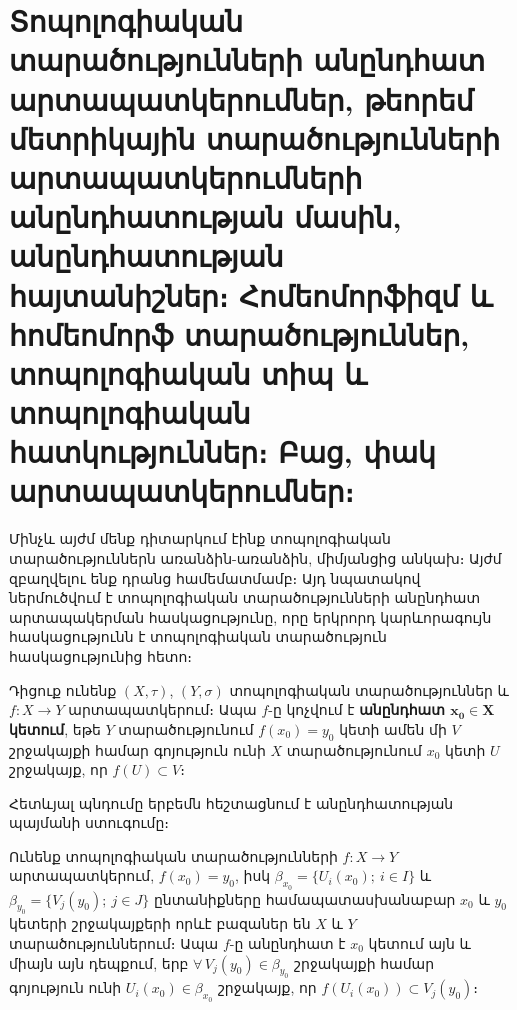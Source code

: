 \documentclass[./main.tex]{subfiles}
\begin{document}
\onehalfspacing
\section{Տոպոլոգիական տարածությունների անընդհատ արտապատկերումներ, թեորեմ մետրիկային տարածությունների արտապատկերումների անընդհատության մասին, անընդհատության հայտանիշներ։ Հոմեոմորֆիզմ և հոմեոմորֆ տարածություններ, տոպոլոգիական տիպ և տոպոլոգիական հատկություններ։ Բաց, փակ արտապատկերումներ։}
\label{sec:9}

\par Մինչև այժմ մենք դիտարկում էինք տոպոլոգիական տարածություններն առան\-ձին-առանձին, միմյանցից անկախ։ Այժմ զբաղվելու ենք դրանց համեմատմամբ։ Այդ նպատակով ներմուծվում է տոպոլոգիական տարածությունների անընդհատ արտապակերման հասկացությունը, որը երկրորդ կարևորագույն հասկացությունն է տոպոլոգիական տարածություն հասկացությունից հետո։

\begin{definition}
Դիցուք ունենք $(X, \tau)$, $(Y, \sigma)$ տոպոլոգիական տարածություններ և ${f:X \rightarrow Y}$ արտապատկերում։ Ապա $f$-ը կոչվում է \textbf{անընդհատ $\boldsymbol{x_0\in X}$ կետում}, եթե $Y$ տարածությունում $f(x_0)=y_0$ կետի ամեն մի $V$ շրջակայքի համար գոյություն ունի $X$ տարածությունում $x_0$ կետի $U$ շրջակայք, որ $f(U)\subset V$։

\end{definition}
\par Հետևյալ պնդումը երբեմն հեշտացնում է անընդհատության պայմանի ստուգումը։

\begin{theorem}\label{ch9thm1} 
Ունենք տոպոլոգիական տարածությունների ${f:X \rightarrow Y}$ արտապատ\-կերում, $f(x_0)=y_{0}$, իսկ $\beta_{x_0}=\{U_i(x_0);\ i\in I\}$ և $\beta_{y_0}=\{V_j(y_0);\ j\in J\}$ ընտանիքները համապատասխանաբար $x_0$ և $y_0$ կետերի շրջակայքերի որևէ բազաներ են $X$ և $Y$ տարածություններում։ Ապա $f$-ը անընդհատ է $x_0$ կետում այն և միայն այն դեպքում, երբ $\forall\, V_j(y_0)\in \beta_{y_0}$ շրջակայքի համար գոյություն ունի $U_i(x_0)\in \beta_{x_0}$ շրջակայք, որ $f(U_i (x_0 ))\subset V_j(y_0)$։
\label{թեորեմ $1$}
\end{theorem}
\end{document}

